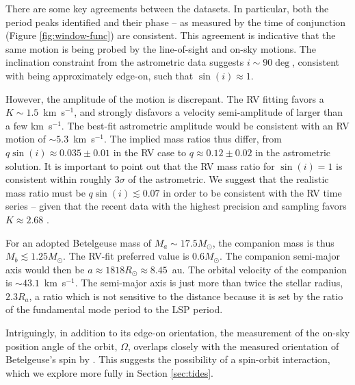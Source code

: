 \documentclass[twocolumn]{aastex631}
\begin{document}
There are some key agreements between the datasets. In particular, both the period peaks identified and their phase -- as measured by the time of conjunction (Figure \ref{fig:window-func}) are consistent. This agreement is indicative that the same motion is being probed by the line-of-sight and on-sky motions. The inclination constraint from the astrometric data suggests $i\sim 90\deg$, consistent with being approximately edge-on, such that $\sin(i) \approx 1$. 

However, the amplitude of the motion is discrepant. The RV fitting favors a $K\sim 1.5$~km~s$^{-1}$, and strongly disfavors a velocity semi-amplitude of larger than a few km~s$^{-1}$. The best-fit astrometric amplitude would be consistent with an RV motion of $\sim 5.3$~km~s$^{-1}$. The implied mass ratios thus differ, from $q\sin(i) \approx 0.035 \pm 0.01$ in the RV case to $q \approx 0.12 \pm 0.02$ in the astrometric solution. It is important to point out that the RV mass ratio for $\sin(i)=1$ is consistent within roughly $3\sigma$ of the astrometric. 
We suggest that the realistic mass ratio must be $q\sin(i) \lesssim 0.07$ in order to be consistent with the RV time series -- given that the recent data with the highest precision and sampling favors $K\approx 2.68$ \citep{2022csss.confE.185G,2024arXiv240809089G}. 

For an adopted Betelgeuse mass  of $M_a \sim 17.5 M_\odot$, the companion mass is thus $M_b \lesssim 1.25 M_\odot$. The RV-fit preferred value is $0.6 M_\odot$. The companion semi-major axis would then be $a\approx 1818 R_\odot \approx 8.45 $~au. The orbital velocity of the companion is $\sim 43.1$~km~s$^{-1}$. The semi-major axis is just more than twice the stellar radius, $2.3 R_a$, a ratio which is not sensitive to the distance because it is set by the ratio of the fundamental mode period to the LSP period. 

Intriguingly, in addition to its edge-on orientation, the measurement of the on-sky position angle of the orbit, $\Omega$, overlaps closely with the measured orientation of Betelgeuse's spin by \citet{2018A&A...609A..67K}. This suggests the possibility of a spin-orbit interaction, which we explore more fully in Section \ref{sec:tides}. 
\end{document}
